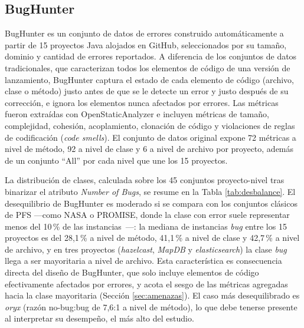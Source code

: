 \documentclass[conference,a4paper]{IEEEtran}
\begin{document}
\subsection{BugHunter}

BugHunter \cite{ferenc2020} es un conjunto de datos de errores construido automáticamente a partir de 15 proyectos Java alojados en GitHub, seleccionados por su tamaño, dominio y cantidad de errores reportados. A diferencia de los conjuntos de datos tradicionales, que caracterizan todos los elementos de código de una versión de lanzamiento, BugHunter captura el estado de cada elemento de código (archivo, clase o método) justo antes de que se le detecte un error y justo después de su corrección, e ignora los elementos nunca afectados por errores. Las métricas fueron extraídas con OpenStaticAnalyzer \cite{osa2004} e incluyen métricas de tamaño, complejidad, cohesión, acoplamiento, clonación de código y violaciones de reglas de codificación (\textit{code smells}). El conjunto de datos original expone 72 métricas a nivel de método, 92 a nivel de clase y 6 a nivel de archivo por proyecto, además de un conjunto ``All'' por cada nivel que une los 15 proyectos.

La distribución de clases, calculada sobre los 45 conjuntos proyecto-nivel tras binarizar el atributo \textit{Number of Bugs}, se resume en la Tabla \ref{tab:desbalance}. El desequilibrio de BugHunter es moderado si se compara con los conjuntos clásicos de PFS ---como NASA o PROMISE, donde la clase con error suele representar menos del 10\,\% de las instancias~\cite{tantithamthavorn2020}---: la mediana de instancias \textit{bug} entre los 15 proyectos es del 28,1\,\% a nivel de método, 41,1\,\% a nivel de clase y 42,7\,\% a nivel de archivo, y en tres proyectos (\textit{hazelcast}, \textit{MapDB} y \textit{elasticsearch}) la clase \textit{bug} llega a ser mayoritaria a nivel de archivo. Esta característica es consecuencia directa del diseño de BugHunter, que solo incluye elementos de código efectivamente afectados por errores, y acota el sesgo de las métricas agregadas hacia la clase mayoritaria (Sección \ref{sec:amenazas}). El caso más desequilibrado es \textit{oryx} (razón no-bug:bug de 7,6:1 a nivel de método), lo que debe tenerse presente al interpretar su desempeño, el más alto del estudio.
\end{document}
